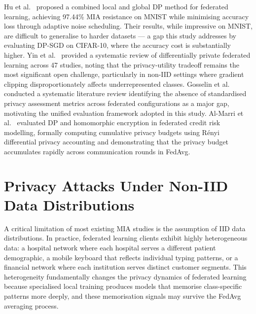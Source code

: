 \documentclass[12pt, a4paper]{report}
\begin{document}
Hu et al.~\cite{hu2024dp} proposed a combined local and global DP method for
federated learning, achieving 97.44\% MIA resistance on MNIST while minimising
accuracy loss through adaptive noise scheduling. Their results, while impressive
on MNIST, are difficult to generalise to harder datasets --- a gap this study
addresses by evaluating DP-SGD on CIFAR-10, where the accuracy cost is
substantially higher. Yin et al.~\cite{yin2024dpfl} provided a systematic review
of differentially private federated learning across 47 studies, noting that the
privacy-utility tradeoff remains the most significant open challenge, particularly
in non-IID settings where gradient clipping disproportionately affects
underrepresented classes. Gosselin et al.~\cite{gosselin2024} conducted a
systematic literature review identifying the absence of standardised privacy
assessment metrics across federated configurations as a major gap, motivating the
unified evaluation framework adopted in this study. Al-Marri et
al.~\cite{almarri2026credit} evaluated DP and homomorphic encryption in federated
credit risk modelling, formally computing cumulative privacy budgets using
R\'{e}nyi differential privacy accounting and demonstrating that the privacy
budget accumulates rapidly across communication rounds in FedAvg.

\section{Privacy Attacks Under Non-IID Data Distributions}

A critical limitation of most existing MIA studies is the assumption of IID data
distributions. In practice, federated learning clients exhibit highly heterogeneous
data: a hospital network where each hospital serves a different patient demographic,
a mobile keyboard that reflects individual typing patterns, or a financial network
where each institution serves distinct customer segments. This heterogeneity
fundamentally changes the privacy dynamics of federated learning because specialised
local training produces models that memorise class-specific patterns more deeply,
and these memorisation signals may survive the FedAvg averaging process.
\end{document}
